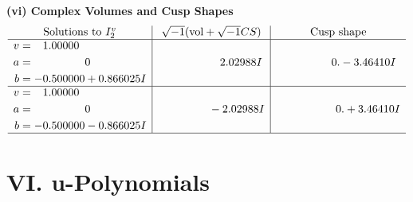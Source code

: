 \documentclass[1p]{elsarticle_modified}
\theoremstyle{definition}
\newcommand{\I}{\sqrt{-1}}
\begin{document}
\newpage\flushleft \textbf{(vi) Complex Volumes and Cusp Shapes}
$$\begin{array}{c|c|c}  
\text{Solutions to }I^v_{2}& \I (\text{vol} + \sqrt{-1}CS) & \text{Cusp shape}\\
 \hline 
\begin{aligned}
v &= \phantom{-}1.00000\phantom{ +0.000000I} \\
a &= \phantom{-0.000000 } 0 \\
b &= -0.500000 + 0.866025 I\end{aligned}
 & \phantom{-0.000000 -}2.02988 I & \phantom{-0.000000 } 0. - 3.46410 I \\ \hline\begin{aligned}
v &= \phantom{-}1.00000\phantom{ +0.000000I} \\
a &= \phantom{-0.000000 } 0 \\
b &= -0.500000 - 0.866025 I\end{aligned}
 & \phantom{-0.000000 } -2.02988 I & \phantom{-0.000000 -}0. + 3.46410 I\\
 \hline 
 \end{array}$$\newpage
\newpage\renewcommand{\arraystretch}{1}
\centering \section*{ VI. u-Polynomials}
\end{document}
